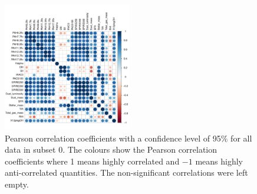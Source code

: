      
      \begin{figure}
                \centering
                \includegraphics[width=0.5\textwidth]{../images0.01/cor_plots/M31_all_derived_ones_core_plot_for_paper.pdf}
            \caption{Pearson correlation coefficients with a confidence level of 95$\%$ for all data in subset 0. The colours show the Pearson correlation coefficients where 1 means highly correlated and $-1$ means highly anti-correlated quantities. The non-significant correlations were left empty.}
            \label{fig: cor_all}
        \end{figure}
 
  
